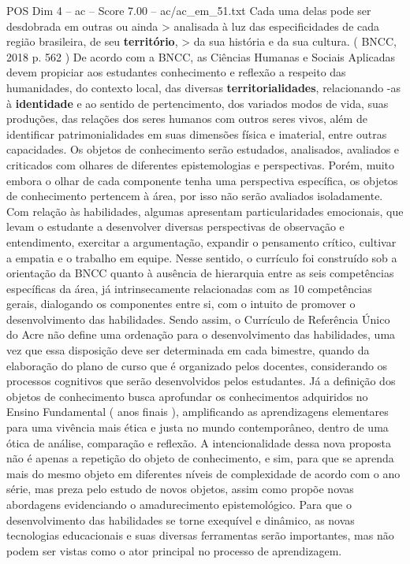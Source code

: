\begin{textsample}{POS Dim 4 – ac – Score 7.00 – ac/ac\_em\_51.txt}
Cada uma delas pode ser desdobrada em outras ou ainda > analisada à luz das especificidades de cada região brasileira, de seu \textbf{território}, > da sua história e da sua cultura. ( BNCC, 2018 p. 562 ) De acordo com a BNCC, as Ciências Humanas e Sociais Aplicadas devem propiciar aos estudantes conhecimento e reflexão a respeito das humanidades, do contexto local, das diversas \textbf{territorialidades}, relacionando -as à \textbf{identidade} e ao sentido de pertencimento, dos variados modos de vida, suas produções, das relações dos seres humanos com outros seres vivos, além de identificar patrimonialidades em suas dimensões física e imaterial, entre outras capacidades.
Os objetos de conhecimento serão estudados, analisados, avaliados e criticados com olhares de diferentes epistemologias e perspectivas.
Porém, muito embora o olhar de cada componente tenha uma perspectiva específica, os objetos de conhecimento pertencem à área, por isso não serão avaliados isoladamente.
Com relação às habilidades, algumas apresentam particularidades emocionais, que levam o estudante a desenvolver diversas perspectivas de observação e entendimento, exercitar a argumentação, expandir o pensamento crítico, cultivar a empatia e o trabalho em equipe.
Nesse sentido, o currículo foi construído sob a orientação da BNCC quanto à ausência de hierarquia entre as seis competências específicas da área, já intrinsecamente relacionadas com as 10 competências gerais, dialogando os componentes entre si, com o intuito de promover o desenvolvimento das habilidades.
Sendo assim, o Currículo de Referência Único do Acre não define uma ordenação para o desenvolvimento das habilidades, uma vez que essa disposição deve ser determinada em cada bimestre, quando da elaboração do plano de curso que é organizado pelos docentes, considerando os processos cognitivos que serão desenvolvidos pelos estudantes.
Já a definição dos objetos de conhecimento busca aprofundar os conhecimentos adquiridos no Ensino Fundamental ( anos finais ), amplificando as aprendizagens elementares para uma vivência mais ética e justa no mundo contemporâneo, dentro de uma ótica de análise, comparação e reflexão.
A intencionalidade dessa nova proposta não é apenas a repetição do objeto de conhecimento, e sim, para que se aprenda mais do mesmo objeto em diferentes níveis de complexidade de acordo com o ano série, mas preza pelo estudo de novos objetos, assim como propõe novas abordagens evidenciando o amadurecimento epistemológico.
Para que o desenvolvimento das habilidades se torne exequível e dinâmico, as novas tecnologias educacionais e suas diversas ferramentas serão importantes, mas não podem ser vistas como o ator principal no processo de aprendizagem.

\end{textsample}
